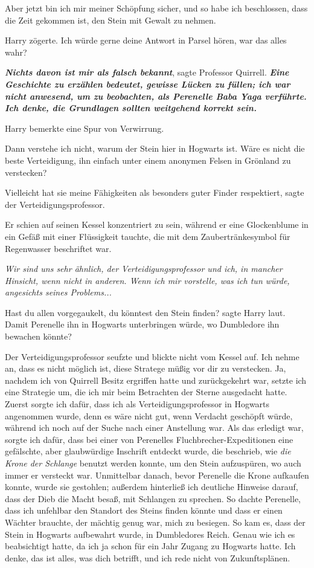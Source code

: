 \glqq{}Aber jetzt bin ich mir meiner Schöpfung sicher, und so habe ich
beschlossen, dass die Zeit gekommen ist, den Stein mit Gewalt zu nehmen.\grqq{}

Harry zögerte. \glqq{}Ich würde gerne deine Antwort in Parsel hören, war das
alles wahr?\grqq{}

\glqq{}\textbf{\emph{Nichts davon ist mir als falsch bekannt}}\grqq{}, sagte
Professor Quirrell. \glqq{}\textbf{\emph{Eine Geschichte zu erzählen bedeutet,
gewisse Lücken zu füllen; ich war nicht anwesend, um zu beobachten, als
Perenelle Baba Yaga verführte. Ich denke, die Grundlagen sollten weitgehend
korrekt sein.\grqq{}} }

Harry bemerkte eine Spur von Verwirrung.

\glqq{}Dann verstehe ich nicht, warum der Stein hier in Hogwarts ist. Wäre es
nicht die beste Verteidigung, ihn einfach unter einem anonymen Felsen in
Grönland zu verstecken?\grqq{}

\glqq{}Vielleicht hat sie meine Fähigkeiten als besonders guter Finder
respektiert\grqq{}, sagte der Verteidigungsprofessor.

Er schien auf seinen Kessel konzentriert zu sein, während er eine Glockenblume
in ein Gefäß mit einer Flüssigkeit tauchte, die mit dem Zaubertränkesymbol für
Regenwasser beschriftet war.

\emph{Wir sind uns sehr ähnlich, der Verteidigungsprofessor und ich, in mancher
Hinsicht, wenn nicht in anderen. Wenn ich mir vorstelle, was ich tun würde,
angesichts seines Problems...}

\glqq{}Hast du allen vorgegaukelt, du könntest den Stein finden?\grqq{} sagte
Harry laut. \glqq{}Damit Perenelle ihn in Hogwarts unterbringen würde, wo
Dumbledore ihn bewachen könnte?\grqq{}

Der Verteidigungsprofessor seufzte und blickte nicht vom Kessel auf. \glqq{}Ich
nehme an, dass es nicht möglich ist, diese Stratege müßig vor dir zu verstecken.
Ja, nachdem ich von Quirrell Besitz ergriffen hatte und zurückgekehrt war,
setzte ich eine Strategie um, die ich mir beim Betrachten der Sterne ausgedacht
hatte. Zuerst sorgte ich dafür, dass ich als Verteidigungsprofessor in Hogwarts
angenommen wurde, denn es wäre nicht gut, wenn Verdacht geschöpft würde, während
ich noch auf der Suche nach einer Anstellung war. Als das erledigt war, sorgte
ich dafür, dass bei einer von Perenelles Fluchbrecher-Expeditionen eine
gefälschte, aber glaubwürdige Inschrift entdeckt wurde, die beschrieb, wie
\emph{die Krone der Schlange} benutzt werden konnte, um den Stein aufzuspüren,
wo auch immer er versteckt war. Unmittelbar danach, bevor Perenelle die Krone
aufkaufen konnte, wurde sie gestohlen; außerdem hinterließ ich deutliche
Hinweise darauf, dass der Dieb die Macht besaß, mit Schlangen zu sprechen. So
dachte Perenelle, dass ich unfehlbar den Standort des Steins finden könnte und
dass er einen Wächter brauchte, der mächtig genug war, mich zu besiegen. So kam
es, dass der Stein in Hogwarts aufbewahrt wurde, in Dumbledores Reich. Genau wie
ich es beabsichtigt hatte, da ich ja schon für ein Jahr Zugang zu Hogwarts
hatte. Ich denke, das ist alles, was dich betrifft, und ich rede nicht von
Zukunftsplänen.\grqq{}

